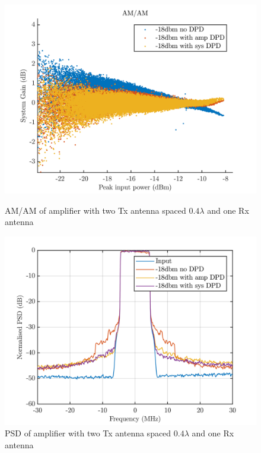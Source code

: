 \begin{figure}[H]
  \centering
  \begin{minipage}[b]{0.5\textwidth}
	\includegraphics[scale = 0.5]{figures/measurement/cree/two/amam_two_ant_0p4.png}
	\caption{AM/AM of amplifier with two Tx antenna spaced $0.4\lambda$ and one Rx antenna}
    \label{fig:cree_amam_two_ant3}
  \end{minipage}
  \hfill
  \begin{minipage}[b]{0.4\textwidth}
\includegraphics[scale = 0.5]{figures/measurement/cree/two/psd_two_ant_0p4.png}
\caption{PSD of amplifier with two Tx antenna spaced $0.4\lambda$ and one Rx antenna}
    \label{fig:cree_psd_two_ant3}
  \end{minipage}
\end{figure}

